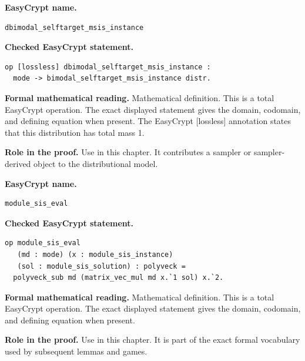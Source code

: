 \begin{formaldefinition}
\noindent\textbf{EasyCrypt name.}
\begin{lstlisting}[language=EasyCrypt,basicstyle=\ttfamily\scriptsize]
dbimodal_selftarget_msis_instance
\end{lstlisting}
\noindent\textbf{Checked EasyCrypt statement.}
\begin{lstlisting}[language=EasyCrypt,basicstyle=\ttfamily\scriptsize]
op [lossless] dbimodal_selftarget_msis_instance :
  mode -> bimodal_selftarget_msis_instance distr.
\end{lstlisting}
\noindent\textbf{Formal mathematical reading.}
Mathematical definition. This is a total EasyCrypt operation.  The exact displayed statement gives the domain, codomain, and defining equation when present.  The EasyCrypt [lossless] annotation states that this distribution has total mass 1.

\noindent\textbf{Role in the proof.}
Use in this chapter. It contributes a sampler or sampler-derived object to the distributional model.

\end{formaldefinition}

\begin{formaldefinition}
\noindent\textbf{EasyCrypt name.}
\begin{lstlisting}[language=EasyCrypt,basicstyle=\ttfamily\scriptsize]
module_sis_eval
\end{lstlisting}
\noindent\textbf{Checked EasyCrypt statement.}
\begin{lstlisting}[language=EasyCrypt,basicstyle=\ttfamily\scriptsize]
op module_sis_eval
   (md : mode) (x : module_sis_instance)
   (sol : module_sis_solution) : polyveck =
  polyveck_sub md (matrix_vec_mul md x.`1 sol) x.`2.
\end{lstlisting}
\noindent\textbf{Formal mathematical reading.}
Mathematical definition. This is a total EasyCrypt operation.  The exact displayed statement gives the domain, codomain, and defining equation when present.

\noindent\textbf{Role in the proof.}
Use in this chapter. It is part of the exact formal vocabulary used by subsequent lemmas and games.

\end{formaldefinition}

